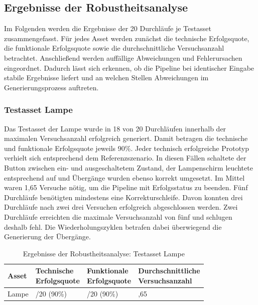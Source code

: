 \subsection{Ergebnisse der Robustheitsanalyse}\label{sec:ergebnisse_robustheitsanalyse}

Im Folgenden werden die Ergebnisse der 20 Durchläufe je Testasset zusammengefasst. Für jedes Asset werden zunächst die technische Erfolgsquote, die funktionale Erfolgsquote sowie die durchschnittliche Versuchsanzahl betrachtet. Anschließend werden auffällige Abweichungen und Fehlerursachen eingeordnet. Dadurch lässt sich erkennen, ob die Pipeline bei identischer Eingabe stabile Ergebnisse liefert und an welchen Stellen Abweichungen im Generierungsprozess auftreten.

\subsubsection*{Testasset Lampe}

Das Testasset der Lampe wurde in 18 von 20 Durchläufen innerhalb der maximalen Versuchsanzahl erfolgreich generiert. Damit betragen die technische und funktionale Erfolgsquote jeweils 90\%. Jeder technisch erfolgreiche Prototyp verhielt sich entsprechend dem Referenzszenario. In diesen Fällen schaltete der Button zwischen ein- und ausgeschaltetem Zustand, der Lampenschirm leuchtete entsprechend auf und Übergänge wurden ebenso korrekt umgesetzt. Im Mittel waren 1,65 Versuche nötig, um die Pipeline mit Erfolgsstatus zu beenden. Fünf Durchläufe benötigten mindestens eine Korrekturschleife. Davon konnten drei Durchläufe nach zwei \bzw drei Versuchen erfolgreich abgeschlossen werden. Zwei Durchläufe erreichten die maximale Versuchsanzahl von fünf und schlugen deshalb fehl. Die Wiederholungszyklen betrafen dabei überwiegend die Generierung der Übergänge.

\begin{table}[htbp]
  \centering
  \begin{tabularx}{\linewidth}{X>{\raggedright\arraybackslash}X>{\raggedright\arraybackslash}X>{\raggedright\arraybackslash}X}
    \toprule
    Asset & \shortstack[l]{Technische\\Erfolgsquote} & \shortstack[l]{Funktionale\\Erfolgsquote} & \shortstack[l]{Durchschnittliche\\Versuchsanzahl} \\
    \midrule
    Lampe & 18/20 (90\%)                             & 18/20 (90\%)                              & 1,65                                              \\
    \bottomrule
  \end{tabularx}
  \caption{Ergebnisse der Robustheitsanalyse: Testasset Lampe}\label{tab:robustheitsanalyse_ergebnisse}
\end{table}

